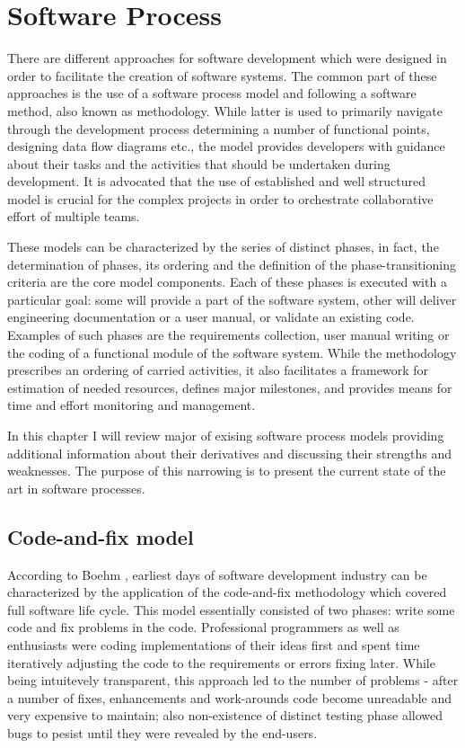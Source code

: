 \chapter{Software Process}
There are different approaches for software development which were designed in order to 
facilitate the creation of software systems. The common part of these approaches is the use 
of a software process model and following a software method, also known as methodology.
While latter is used to primarily navigate through the development process determining
a number of functional points, designing data flow diagrams etc., the model provides 
developers with guidance about their tasks and the activities that should be undertaken 
during development. It is advocated that the use of established and well structured 
model is crucial for the complex projects in order to orchestrate collaborative effort 
of multiple teams. 

These models can be characterized by the series of distinct phases, in fact, the 
determination of phases, its ordering and the definition of the phase-transitioning 
criteria are the core model components.
Each of these phases is executed with a particular goal: some will provide a part of the 
software system, other will deliver engineering documentation or a user manual, or 
validate an existing code. Examples of such phases are the requirements collection, 
user manual writing or the coding of a functional module of the software system. 
While the methodology prescribes an ordering of carried activities, it also facilitates
a framework for estimation of needed resources, defines major milestones, and provides 
means for time and effort monitoring and management. 

In this chapter I will review major of exising software process models providing additional 
information about their derivatives and discussing their strengths and weaknesses.
The purpose of this narrowing is to present the current state of the art in software 
processes.

\section{Code-and-fix model}
According to Boehm \cite{citeulike:10002126}, earliest days of software development 
industry can be characterized by the application of the code-and-fix methodology
which covered full software life cycle. This model essentially consisted of two phases:
write some code and fix problems in the code. Professional programmers as well as enthusiasts 
were coding implementations of their ideas first and spent time iteratively adjusting the 
code to the requirements or errors fixing later. While being intuitevely transparent, this 
approach led to the number of problems - after a number of fixes, enhancements and 
work-arounds code become unreadable and very expensive to maintain; also non-existence of
distinct testing phase allowed bugs to pesist until they were revealed by the end-users.

